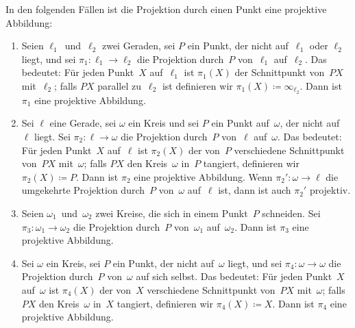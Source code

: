 \begin{satzmitnamen}[Lemma]
	In den folgenden Fällen ist die Projektion durch einen Punkt eine projektive Abbildung:
	\begin{enumerate}
		\item \label{itm:projAbb:GG}
		Seien $\ell_1$~und~$\ell_2$ zwei Geraden, sei $P$ ein Punkt, der nicht auf~$\ell_1$ oder $\ell_2$ liegt, und sei $\pi_1\colon \ell_1\to \ell_2$ die Projektion durch~$P$ von~$\ell_1$ auf~$\ell_2$. Das bedeutet: Für jeden Punkt~$X$ auf~$\ell_1$ ist $\pi_1(X)$ der Schnittpunkt von~$PX$ mit~$\ell_2$; falls $PX$ parallel zu~$\ell_2$ ist definieren wir $\pi_1(X)\coloneqq \infty_{\ell_2}$. Dann ist $\pi_1$ eine projektive Abbildung.
		\item \label{itm:projAbb:GK}
		Sei $\ell$ eine Gerade, sei $\omega$ ein Kreis und sei $P$ ein Punkt auf~$\omega$, der nicht auf~$\ell$ liegt.
		Sei $\pi_2\colon \ell\to \omega$ die Projektion durch~$P$ von~$\ell$ auf~$\omega$. Das bedeutet: Für jeden Punkt~$X$ auf~$\ell$ ist $\pi_2(X)$ der von~$P$ verschiedene Schnittpunkt von~$PX$ mit~$\omega$; falls $PX$ den Kreis~$\omega$ in~$P$ tangiert, definieren wir $\pi_2(X)\coloneqq P$.
		Dann ist $\pi_2$ eine projektive Abbildung. Wenn $\pi_2'\colon\omega\to \ell$ die umgekehrte Projektion durch~$P$ von~$\omega$ auf~$\ell$ ist, dann ist auch $\pi_2'$ projektiv.
		\item \label{itm:projAbb:KK}
		Seien $\omega_1$~und~$\omega_2$ zwei Kreise, die sich in einem Punkt~$P$ schneiden. Sei $\pi_3\colon \omega_1\to \omega_2$ die Projektion durch~$P$ von~$\omega_1$ auf~$\omega_2$. Dann ist $\pi_3$ eine projektive Abbildung.
		\item \label{itm:projAbb:K}
		Sei $\omega$ ein Kreis, sei $P$ ein Punkt, der nicht auf~$\omega$ liegt, und sei $\pi_4\colon \omega\to \omega$ die Projektion durch~$P$ von~$\omega$ auf sich selbst. Das bedeutet: Für jeden Punkt~$X$ auf~$\omega$ ist $\pi_4(X)$ der von~$X$ verschiedene Schnittpunkt von~$PX$ mit~$\omega$; falls $PX$ den Kreis~$\omega$ in~$X$ tangiert, definieren wir $\pi_4(X)\coloneqq X$. Dann ist $\pi_4$ eine projektive Abbildung.
	\end{enumerate}
\end{satzmitnamen}

